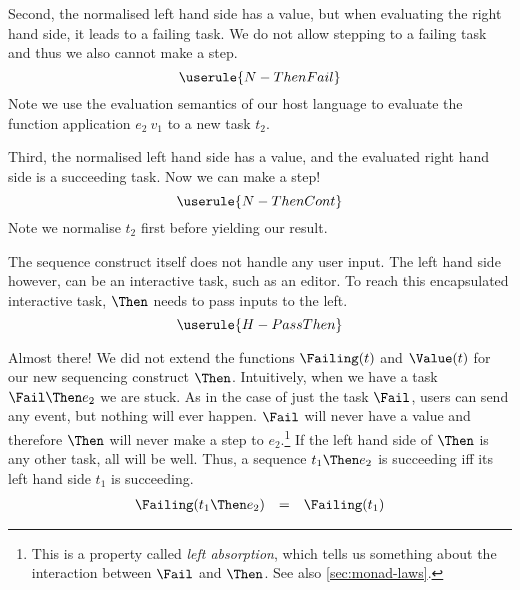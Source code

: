 Second,
the normalised left hand side has a value,
but when evaluating the right hand side,
it leads to a failing task.
We do not allow stepping to a failing task
and thus we also cannot make a step.
\begin{equation*}
  \userule{N-ThenFail}
\end{equation*}
Note we use the evaluation semantics of our host language
to evaluate the function application $e_2\ v_1$ to a new task $t_2$.

Third,
the normalised left hand side has a value,
and the evaluated right hand side is a succeeding task.
Now we can make a step!
\begin{equation*}
  \userule{N-ThenCont}
\end{equation*}
Note we normalise $t_2$ first before yielding our result.

The sequence construct itself does not handle any user input.
The left hand side however,
can be an interactive task, such as an editor.
To reach this encapsulated interactive task,
$\Then$ needs to pass inputs to the left.
\begin{equation*}
  \userule{H-PassThen}
\end{equation*}

Almost there!
We did not extend the functions $\Failing(t)$ and $\Value(t)$ for our new sequencing construct $\Then$.
Intuitively,
when we have a task $\Fail \Then e_2$ we are stuck.
As in the case of just the task $\Fail$,
users can send any event,
but nothing will ever happen.
$\Fail$ will never have a value
and therefore $\Then$ will never make a step to $e_2$.\footnote{
  This is a property called \emph{left absorption},
  which tells us something about the interaction between $\Fail$ and $\Then$.
  See also \autoref{sec:monad-laws}.
}
If the left hand side of $\Then$ is any other task,
all will be well.
Thus,
a sequence $t_1 \Then e_2$ is succeeding iff its left hand side $t_1$ is succeeding.
\begin{equation*}
  \begin{array}{lcl}
    \Failing(t_1 \Then e_2) &=& \Failing(t_1)
  \end{array}
\end{equation*}

